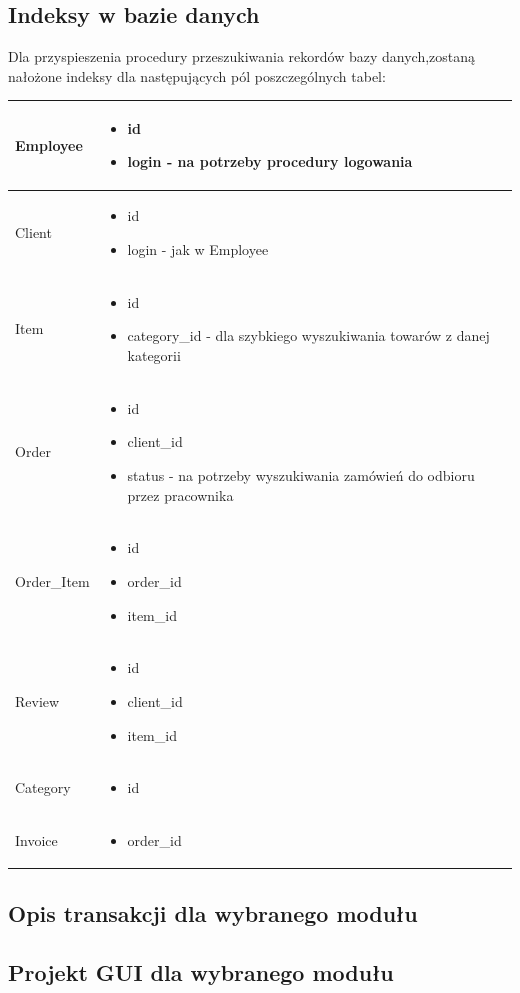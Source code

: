 \documentclass[10pt,a4paper]{article}
\begin{document}
  \subsection{Indeksy w bazie danych}
  Dla przyspieszenia procedury przeszukiwania rekordów bazy danych,zostaną nałożone indeksy dla następujących pól poszczególnych tabel:
  \flushleft
  \begin{longtable}{| m{3cm} | m{9cm} |}
  \hline
  Employee &  \begin{itemize}
  			  \item id
			  \item login - na potrzeby procedury logowania
			  \end{itemize}\\ \hline
  Client   &  \begin{itemize}
	    	  \item	id
    		  \item login - jak w Employee
			  \end{itemize}\\ \hline
  Item     &  \begin{itemize}
      		  \item id
    		  \item category\_id - dla szybkiego wyszukiwania towarów z danej kategorii
			  \end{itemize}\\ \hline
  Order    &  \begin{itemize}
      		  \item id
    		  \item client\_id
    		  \item status - na potrzeby wyszukiwania zamówień do odbioru przez pracownika
			  \end{itemize}\\ \hline
Order\_Item &  \begin{itemize}
	          \item id
	          \item order\_id
	          \item item\_id
			  \end{itemize}\\ \hline
Review	   &  \begin{itemize}
   			  \item id
   			  \item client\_id
   			  \item item\_id
			  \end{itemize}\\ \hline
Category   &  \begin{itemize}
		      \item id
			  \end{itemize}\\ \hline
Invoice	   &  \begin{itemize}
		      \item order\_id
			  \end{itemize}\\ \hline
  
   \end{longtable}
   \newpage
   \subsection{Opis transakcji dla wybranego modułu}
   \newpage
   \subsection{Projekt GUI dla wybranego modułu}
   
\end{document}
